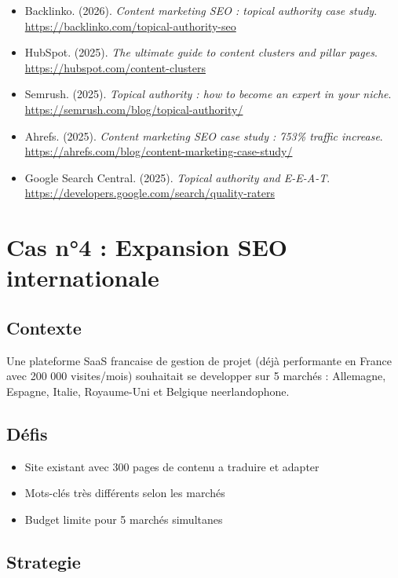 \documentclass[12pt,a4paper,twoside]{report}
\begin{document}
\begin{itemize}
    \item Backlinko. (2026). \textit{Content marketing SEO : topical authority case study}. \url{https://backlinko.com/topical-authority-seo}
    \item HubSpot. (2025). \textit{The ultimate guide to content clusters and pillar pages}. \url{https://hubspot.com/content-clusters}
    \item Semrush. (2025). \textit{Topical authority : how to become an expert in your niche}. \url{https://semrush.com/blog/topical-authority/}
    \item Ahrefs. (2025). \textit{Content marketing SEO case study : 753\% traffic increase}. \url{https://ahrefs.com/blog/content-marketing-case-study/}
    \item Google Search Central. (2025). \textit{Topical authority and E-E-A-T}. \url{https://developers.google.com/search/quality-raters}
\end{itemize}

\section{Cas n°4 : Expansion SEO internationale}

\subsection{Contexte}
Une plateforme SaaS francaise de gestion de projet (déjà performante en France avec 200 000 visites/mois) souhaitait se developper sur 5 marchés : Allemagne, Espagne, Italie, Royaume-Uni et Belgique neerlandophone.

\subsection{Défis}
\begin{itemize}
    \item Site existant avec 300 pages de contenu a traduire et adapter
    \item Mots-clés très différents selon les marchés
    \item Budget limite pour 5 marchés simultanes
\end{itemize}

\subsection{Strategie}
\end{document}
